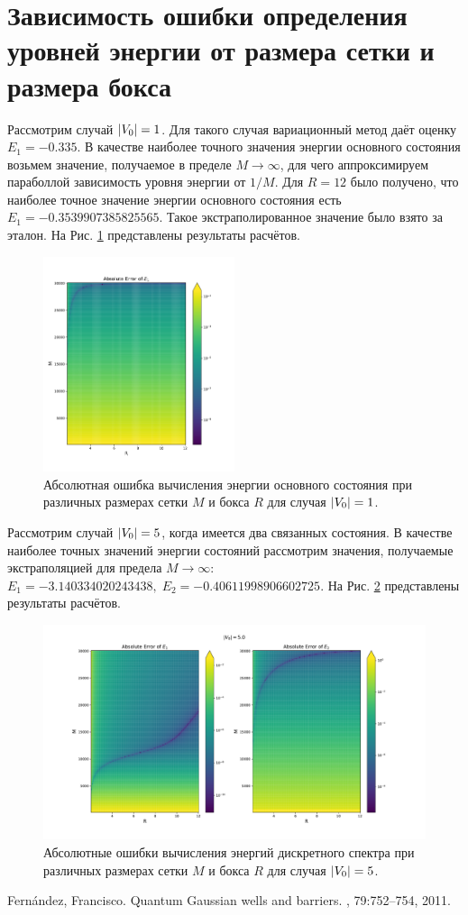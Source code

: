 \documentclass[10pt]{article}
\begin{document}
\section{Зависимость ошибки определения уровней энергии от размера сетки и размера бокса}

Рассмотрим случай $\abs{V_0}=1$. Для такого случая вариационный метод даёт оценку $E_1 = -0.335$. В качестве наиболее точного значения энергии основного состояния возьмем значение, получаемое в пределе $M\rightarrow \infty$, для чего аппроксимируем параболлой зависимость уровня энергии от $1/M$. Для $R=12$ было получено, что наиболее точное значение энергии основного состояния есть $E_1 = -0.3539907385825565$. Такое экстраполированное значение было взято за эталон. На Рис. \ref{fig:abserr} представлены результаты расчётов.
\begin{figure}[htbp]
    \centering
    \includegraphics[width=0.5\textwidth]{../figures/abserr}
    \caption{Абсолютная ошибка вычисления энергии основного состояния при различных размерах сетки $M$ и бокса $R$ для случая $\abs{V_0}=1$.}
    \label{fig:abserr}
\end{figure}

Рассмотрим случай $\abs{V_0}=5$, когда имеется два связанных состояния. В качестве наиболее точных значений энергии состояний рассмотрим значения, получаемые экстраполяцией для предела $M\rightarrow \infty$: $E_1=-3.140334020243438,\; E_2= -0.40611998906602725$. На Рис. \ref{fig:abserr_v0_5} представлены результаты расчётов.
\begin{figure}[htbp]
    \centering
    \includegraphics[width=\textwidth]{../figures/abserr_v0_5}
    \caption{Абсолютные ошибки вычисления энергий дискретного спектра при различных размерах сетки $M$ и бокса $R$ для случая $\abs{V_0}=5$.}
    \label{fig:abserr_v0_5}
\end{figure}

\begin{thebibliography}{10}
    Fernández, Francisco.
    \newblock Quantum Gaussian wells and barriers.
    , 79:752--754, 2011.
\end{thebibliography}
\end{document}
